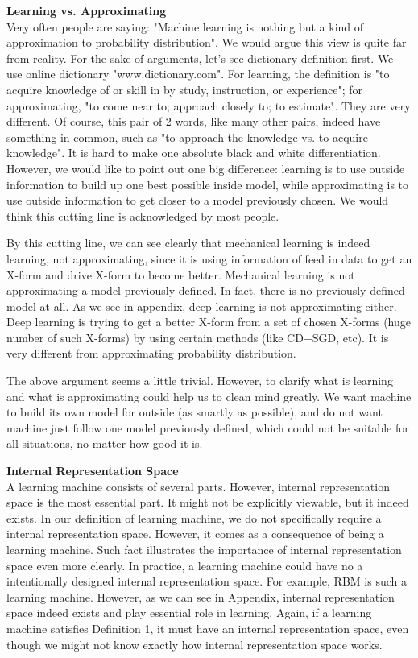 {\bf Learning vs. Approximating}\\
Very often people are saying: "Machine learning is nothing but a kind of approximation to probability distribution". We would argue this view is quite far from reality. For the sake of arguments, let's see dictionary definition first. We use online dictionary "www.dictionary.com". For learning, the definition is "to acquire knowledge of or skill in by study, instruction, or experience"; for approximating, "to come near to; approach closely to; to estimate". They are very different. Of course, this pair of 2 words, like many other pairs, indeed have something in common, such as "to approach the knowledge vs. to acquire knowledge". It is hard to make one absolute black and white differentiation. However, we would like to point out one big difference: learning is to use outside information to build up one best possible inside model, while approximating is to use outside information to get closer to a model previously chosen. We would think this cutting line is acknowledged by most people. 

By this cutting line, we can see clearly that mechanical learning is indeed learning, not approximating, since it is using information of feed in data to get an X-form and drive X-form to become better. Mechanical learning is not approximating a model previously defined. In fact, there is no previously defined model at all. As we see in appendix, deep learning is not approximating either. Deep learning is trying to get a better X-form from a set of chosen X-forms (huge number of such X-forms) by using certain methods (like CD+SGD, etc). It is very different from approximating probability distribution.     

The above argument seems a little trivial. However, to clarify what is learning and what is approximating could help us to clean mind greatly. We want machine to build its own model for outside (as smartly as possible), and do not want machine just follow one model previously defined, which could not be suitable for all situations, no matter how good it is.
\bigskip

{\bf Internal Representation Space}\\
A learning machine consists of several parts. However, internal representation space is the most essential part. It might not be explicitly viewable, but it indeed exists. In our definition of learning machine, we do not specifically require a internal representation space. However, it comes as a consequence of being a learning machine. Such fact illustrates the importance of internal representation space even more clearly. In practice, a learning machine could have no a intentionally designed internal representation space. For example, RBM is such a learning machine. However, as we can see in Appendix, internal representation space indeed exists and play essential role in learning. Again, if a learning machine satisfies Definition 1, it must have an internal representation space, even though we might not know exactly how internal representation space works.

